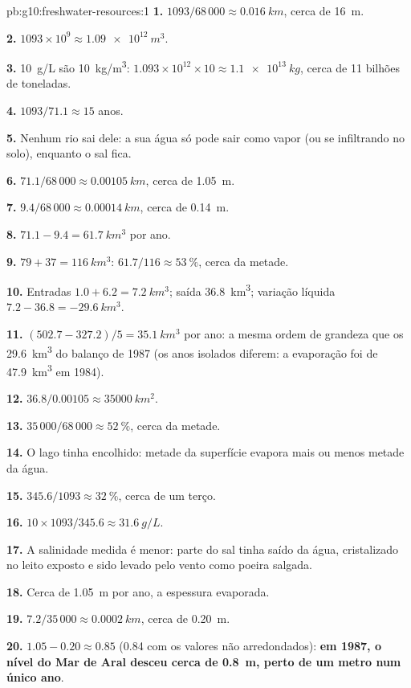 \begin{solution}{pb:g10:freshwater-resources:1}
\textbf{1.} $1093/68\,000 \approx \qty{0.016}{km}$, cerca de \qty{16}{m}.

\textbf{2.} $1093 \times 10^9 \approx \qty{1.09e12}{m^3}$.

\textbf{3.} \qty{10}{g/L} são \qty{10}{kg/m^3}: $1.093 \times 10^{12} \times 10
\approx \qty{1.1e13}{kg}$, cerca de \num{11} bilhões de toneladas.

\textbf{4.} $1093/71.1 \approx 15$ anos.

\textbf{5.} Nenhum rio sai dele: a sua água só pode sair como vapor (ou se
infiltrando no solo), enquanto o sal fica.

\textbf{6.} $71.1/68\,000 \approx \qty{0.00105}{km}$, cerca de \qty{1.05}{m}.

\textbf{7.} $9.4/68\,000 \approx \qty{0.00014}{km}$, cerca de \qty{0.14}{m}.

\textbf{8.} $71.1 - 9.4 = \qty{61.7}{km^3}$ por ano.

\textbf{9.} $79 + 37 = \qty{116}{km^3}$: $61.7/116 \approx \qty{53}{\percent}$,
cerca da metade.

\textbf{10.} Entradas $1.0 + 6.2 = \qty{7.2}{km^3}$; saída \qty{36.8}{km^3};
variação líquida $7.2 - 36.8 = \qty{-29.6}{km^3}$.

\textbf{11.} $(502.7 - 327.2)/5 = \qty{35.1}{km^3}$ por ano: a mesma ordem
de grandeza que os \qty{29.6}{km^3} do balanço de 1987 (os anos isolados
diferem: a evaporação foi de \qty{47.9}{km^3} em 1984).

\textbf{12.} $36.8/0.00105 \approx \qty{35000}{km^2}$.

\textbf{13.} $35\,000/68\,000 \approx \qty{52}{\percent}$, cerca da metade.

\textbf{14.} O lago tinha encolhido: metade da superfície evapora mais ou
menos metade da água.

\textbf{15.} $345.6/1093 \approx \qty{32}{\percent}$, cerca de um terço.

\textbf{16.} $10 \times 1093/345.6 \approx \qty{31.6}{g/L}$.

\textbf{17.} A salinidade medida é menor: parte do sal tinha saído da água,
cristalizado no leito exposto e sido levado pelo vento como poeira salgada.

\textbf{18.} Cerca de \qty{1.05}{m} por ano, a espessura evaporada.

\textbf{19.} $7.2/35\,000 \approx \qty{0.0002}{km}$, cerca de \qty{0.20}{m}.

\textbf{20.} $1.05 - 0.20 \approx 0.85$ (\num{0.84} com os valores não
arredondados): \textbf{em 1987, o nível do Mar de Aral desceu cerca de
\qty{0.8}{m}, perto de um metro num único ano}.
\end{solution}
